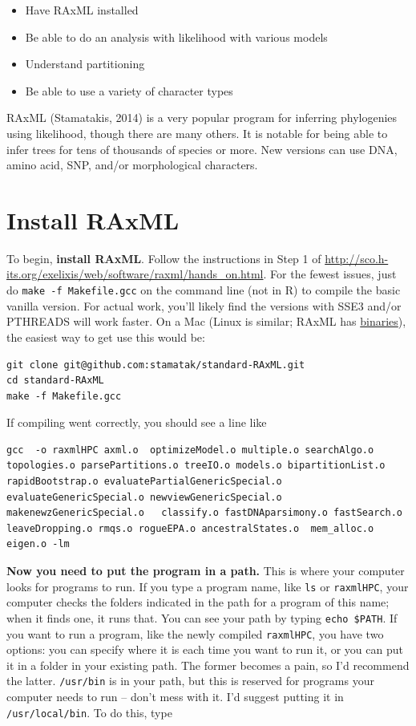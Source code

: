 \documentclass[]{book}
\providecommand{\tightlist}{%
  \setlength{\itemsep}{0pt}\setlength{\parskip}{0pt}}
\theoremstyle{definition}
\theoremstyle{definition}
\theoremstyle{remark}
\begin{document}
\begin{itemize}
\tightlist
\item
  Have RAxML installed
\item
  Be able to do an analysis with likelihood with various models
\item
  Understand partitioning
\item
  Be able to use a variety of character types
\end{itemize}

RAxML (Stamatakis, 2014) is a very popular program for inferring
phylogenies using likelihood, though there are many others. It is
notable for being able to infer trees for tens of thousands of species
or more. New versions can use DNA, amino acid, SNP, and/or morphological
characters.

\section{Install RAxML}\label{install-raxml}

To begin, \textbf{install RAxML}. Follow the instructions in Step 1 of
\url{http://sco.h-its.org/exelixis/web/software/raxml/hands_on.html}.
For the fewest issues, just do \texttt{make\ -f\ Makefile.gcc} on the
command line (not in R) to compile the basic vanilla version. For actual
work, you'll likely find the versions with SSE3 and/or PTHREADS will
work faster. On a Mac (Linux is similar; RAxML has
\href{https://github.com/stamatak/standard-RAxML/tree/master/WindowsExecutables_v8.2.4}{binaries}),
the easiest way to get use this would be:

\begin{verbatim}
git clone git@github.com:stamatak/standard-RAxML.git
cd standard-RAxML
make -f Makefile.gcc
\end{verbatim}

If compiling went correctly, you should see a line like

\begin{verbatim}
gcc  -o raxmlHPC axml.o  optimizeModel.o multiple.o searchAlgo.o topologies.o parsePartitions.o treeIO.o models.o bipartitionList.o rapidBootstrap.o evaluatePartialGenericSpecial.o evaluateGenericSpecial.o newviewGenericSpecial.o makenewzGenericSpecial.o   classify.o fastDNAparsimony.o fastSearch.o leaveDropping.o rmqs.o rogueEPA.o ancestralStates.o  mem_alloc.o  eigen.o -lm
\end{verbatim}

\textbf{Now you need to put the program in a path.} This is where your
computer looks for programs to run. If you type a program name, like
\texttt{ls} or \texttt{raxmlHPC}, your computer checks the folders
indicated in the path for a program of this name; when it finds one, it
runs that. You can see your path by typing \texttt{echo\ \$PATH}. If you
want to run a program, like the newly compiled \texttt{raxmlHPC}, you
have two options: you can specify where it is each time you want to run
it, or you can put it in a folder in your existing path. The former
becomes a pain, so I'd recommend the latter. \texttt{/usr/bin} is in
your path, but this is reserved for programs your computer needs to run
-- don't mess with it. I'd suggest putting it in
\texttt{/usr/local/bin}. To do this, type
\end{document}
